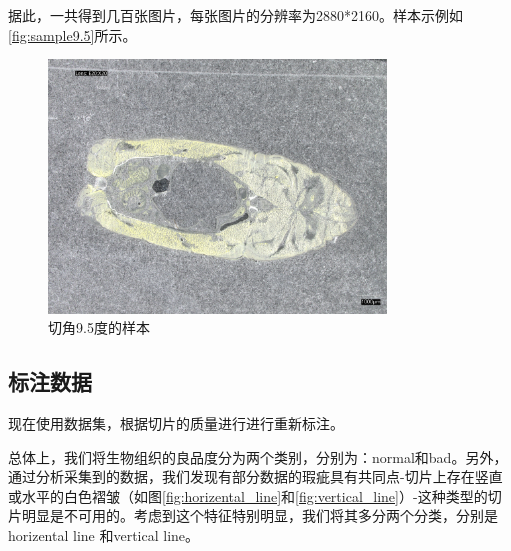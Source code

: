
据此，一共得到几百张图片，每张图片的分辨率为2880*2160。样本示例如\autoref{fig:sample9.5}所示。

\begin{figure}
    \centering
    \includegraphics[width=0.8\textwidth]{./fig/sample9.5.jpg}
    \caption{切角9.5度的样本}
    \label{fig:sample9.5}
\end{figure}


\subsection{标注数据}

现在使用数据集，根据切片的质量进行进行重新标注。

总体上，我们将生物组织的良品度分为两个类别，分别为：normal和bad。另外，通过分析采集到的数据，我们发现有部分数据的瑕疵具有共同点-切片上存在竖直或水平的白色褶皱（如图\autoref{fig:horizental_line}和\autoref{fig:vertical_line}）-这种类型的切片明显是不可用的。考虑到这个特征特别明显，我们将其多分两个分类，分别是horizental line 和vertical line。 

